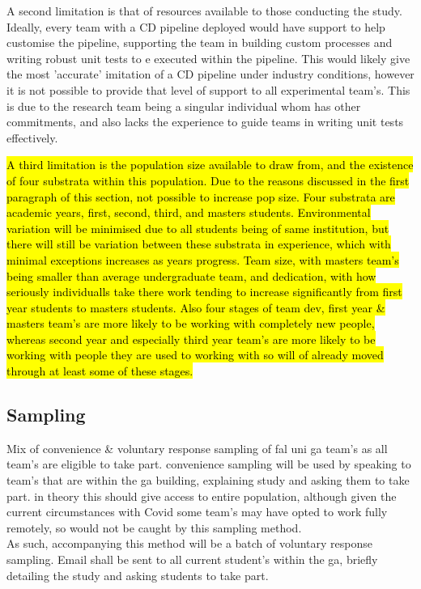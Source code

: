 \documentclass[lettersize,journal]{IEEEtran}
\begin{document}
        A second limitation is that of resources available to those conducting the study. Ideally, every team with a CD pipeline deployed would have support to help customise the pipeline, supporting the team in building custom processes and writing robust unit tests to e executed within the pipeline. This would likely give the most 'accurate' imitation of a CD pipeline under industry conditions, however it is not possible to provide that level of support to all experimental team's. This is due to the research team being a singular individual whom has other commitments, and also lacks the experience to guide teams in writing unit tests effectively.

        \hl{A third limitation is the population size available to draw from, and the existence of four substrata within this population. Due to the reasons discussed in the first paragraph of this section, not possible to increase pop size. Four substrata are academic years, first, second, third, and masters students. Environmental variation will be minimised due to all students being of same institution, but there will still be variation between these substrata in experience, which with minimal exceptions increases as years progress. Team size, with masters team's being smaller than average undergraduate team, and dedication, with how seriously individualls take there work tending to increase significantly from first year students to masters students. Also four stages of team dev, first year \& masters team's are more likely to be working with completely new people, whereas second year and especially third year team's are more likely to be working with people they are used to working with so will of already moved through at least some of these stages.}

    \subsection{Sampling}
        Mix of convenience \& voluntary response sampling of fal uni ga team's as all team's are eligible to take part. convenience sampling will be used by speaking to team's that are within the ga building, explaining study and asking them to take part. in theory this should give access to entire population, although given the current circumstances with Covid \cite{bbcomicron} some team's may have opted to work fully remotely, so would not be caught by this sampling method.\\
        As such, accompanying this method will be a batch of voluntary response sampling. Email shall be sent to all current student's within the ga, briefly detailing the study and asking students to take part. 
\end{document}
